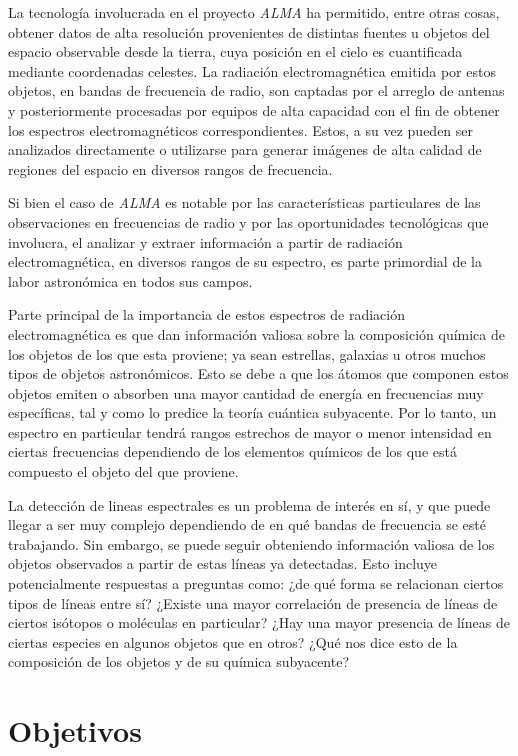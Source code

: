 \begin{intro}
La tecnología involucrada en el proyecto \textit{ALMA} ha permitido, entre otras cosas, obtener datos de alta resolución provenientes de distintas fuentes u objetos del espacio observable desde la tierra, cuya posición en el cielo es cuantificada mediante coordenadas celestes. La radiación electromagnética emitida por estos objetos, en bandas de frecuencia de radio, son captadas por el arreglo de antenas y posteriormente procesadas por equipos de alta capacidad con el fin de obtener los espectros electromagnéticos correspondientes. Estos, a su vez pueden ser analizados directamente o utilizarse para generar imágenes de alta calidad de regiones del espacio en diversos rangos de frecuencia.

Si bien el caso de \textit{ALMA} es notable por las características particulares de las observaciones en frecuencias de radio y por las oportunidades tecnológicas que involucra, el analizar y extraer información a partir de radiación electromagnética, en diversos rangos de su espectro, es parte primordial de la labor astronómica en todos sus campos.

Parte principal de la importancia de estos espectros de radiación electromagnética es que dan información valiosa sobre la composición química de los objetos de los que esta proviene; ya sean estrellas, galaxias u otros muchos tipos de objetos astronómicos. Esto se debe a que los átomos que componen estos objetos emiten o absorben una mayor cantidad de energía en frecuencias muy específicas, tal y como lo predice la teoría cuántica subyacente. Por lo tanto, un espectro en particular tendrá rangos estrechos de mayor o menor intensidad en ciertas frecuencias dependiendo de los elementos químicos de los que está compuesto el objeto del que proviene.

La detección de lineas espectrales es un problema de interés en sí, y que puede llegar a ser muy complejo dependiendo de en qué bandas de frecuencia se esté trabajando. Sin embargo, se puede seguir obteniendo información valiosa de los objetos observados a partir de estas líneas ya detectadas. Esto incluye potencialmente respuestas a preguntas como: ¿de qué forma se relacionan ciertos tipos de líneas entre sí? ¿Existe una mayor correlación de presencia de líneas de ciertos isótopos o moléculas en particular? ¿Hay una mayor presencia de líneas de ciertas especies en algunos objetos que en otros? ¿Qué nos dice esto de la composición de los objetos y de su química subyacente?

\section*{Objetivos}


\end{intro}
